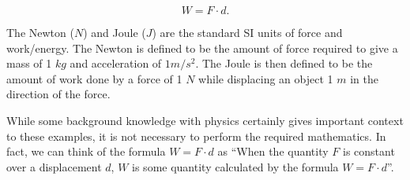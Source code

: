 \documentclass{ximera}
\begin{document}
\[ W = F \cdot d. \]

\begin{fact}
The Newton ($N$) and Joule ($J$) are the standard SI units of force and work/energy.  The Newton is defined to be the amount of force required to give a mass of 1 $kg$ and acceleration of $1m/s^2$.  The Joule is then defined to be the amount of work done by a force of 1 $N$ while displacing  an object 1 $m$ in the direction of the force.
\end{fact}

\begin{remark}
While some background knowledge with physics certainly gives important context to these examples, it is not necessary to perform the required mathematics.  In fact, we can think of the formula $W=F\cdot d$ as ``When the quantity $F$ is constant over a displacement $d$,  $W$ is some quantity calculated by the formula $W=F \cdot d$''.
\end{remark}
\end{document}
